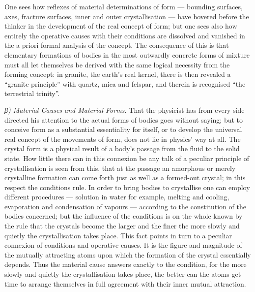\documentclass[12pt,a4paper]{book}
\newcommand{\subrunin}[1]{\emph{#1}\hspace{0.4em}}
\begin{document}
One sees how reflexes of material determinations of form --- bounding surfaces, axes, fracture surfaces, inner and outer
crystallisation --- have hovered before the thinker in the development of the real concept of form; but one sees also how
entirely the operative causes with their conditions are dissolved and vanished in the a priori formal analysis of the
concept. The consequence of this is that elementary formations of bodies in the most outwardly concrete forms of mixture
must all let themselves be derived with the same logical necessity from the forming concept: in granite, the earth's real
kernel, there is then revealed a ``granite principle'' with quartz, mica and felspar, and therein is recognised ``the
terrestrial trinity''.

\subrunin{β) Material Causes and Material Forms.} That the physicist has from every side directed his attention
to the actual forms of bodies goes without saying; but to conceive form as a substantial essentiality for itself, or to
develop the universal real concept of the movements of form, does not lie in physics' way at all. The crystal form is a
physical result of a body's passage from the fluid to the solid state. How little there can in this connexion be any talk
of a peculiar principle of crystallisation is seen from this, that at the passage an amorphous or merely crystalline
formation can come forth just as well as a formed-out crystal; in this respect the conditions rule. In order to bring
bodies to crystallise one can employ different procedures --- solution in water for example, melting and cooling,
evaporation and condensation of vapours --- according to the constitution of the bodies concerned; but the influence of
the conditions is on the whole known by the rule that the crystals become the larger and the finer the more slowly and
quietly the crystallisation takes place. This
fact points in turn to a peculiar connexion of conditions and operative causes. It is the figure and magnitude of the
mutually attracting atoms upon which the formation of the crystal essentially depends. Thus the material cause answers
exactly to the condition, for the more slowly and quietly the crystallisation takes place, the better can the atoms get
time to arrange themselves in full agreement with their inner mutual attraction.
\end{document}
